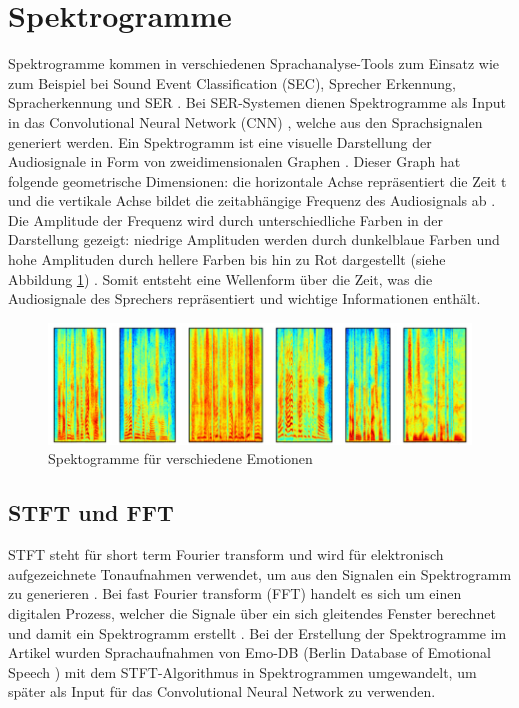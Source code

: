 \section{Spektrogramme}
Spektrogramme kommen in verschiedenen Sprachanalyse-Tools zum Einsatz wie zum Beispiel bei Sound Event Classification (SEC), Sprecher Erkennung, Spracherkennung und SER \cite{spectrogram}.
Bei SER-Systemen dienen Spektrogramme als Input in das Convolutional Neural Network (CNN) \cite{cnn}, welche aus den Sprachsignalen generiert werden. 
Ein Spektrogramm ist eine visuelle Darstellung der Audiosignale in Form von zweidimensionalen Graphen \cite{spectrogram}. Dieser Graph hat folgende geometrische Dimensionen: die horizontale Achse repräsentiert die Zeit t und die vertikale Achse bildet die zeitabhängige Frequenz des Audiosignals ab \cite{badshah2019deep}. Die Amplitude der Frequenz wird durch unterschiedliche Farben in der Darstellung gezeigt: niedrige Amplituden werden durch dunkelblaue Farben und hohe Amplituden durch hellere Farben bis hin zu Rot dargestellt (siehe Abbildung \ref{spektogram}) \cite{spectrogram}. Somit entsteht eine Wellenform über die Zeit, was die Audiosignale des Sprechers repräsentiert und wichtige Informationen enthält. 
\begin{figure}[ht]
	\centering
	\includegraphics[width=1\textwidth]{images/spekto.PNG}
	\caption{\label{spektogram}Spektogramme für verschiedene Emotionen \cite{badshah2019deep}}
\end{figure}
\subsection{STFT und FFT}
STFT steht für short term Fourier transform und wird für elektronisch aufgezeichnete Tonaufnahmen verwendet, um aus den Signalen ein Spektrogramm zu generieren \cite{badshah2019deep}. Bei fast Fourier transform (FFT) handelt es sich um einen digitalen Prozess, welcher die Signale über ein sich gleitendes Fenster berechnet und damit ein Spektrogramm erstellt \cite{badshah2019deep}. Bei der Erstellung der Spektrogramme im Artikel \cite{badshah2019deep} wurden Sprachaufnahmen von Emo-DB (Berlin Database of Emotional Speech \cite{burkhardt2005database}) mit dem STFT-Algorithmus in Spektrogrammen umgewandelt, um später als Input für das Convolutional Neural Network zu verwenden.

